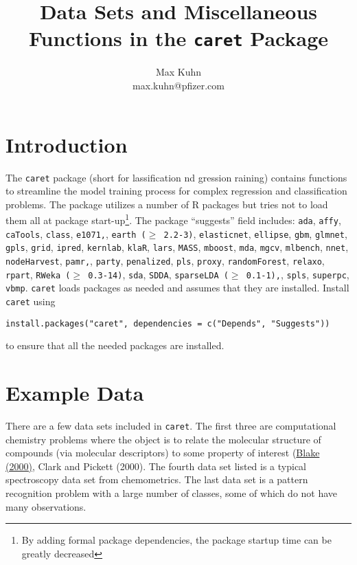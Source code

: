 \documentclass[12pt]{article}
\title{Data Sets and Miscellaneous Functions in the {\tt caret} Package}
\author{Max Kuhn \\ max.kuhn@pfizer.com}
\begin{document}
\maketitle

\thispagestyle{empty}
	
\section{Introduction}


The \texttt{caret} package (short for {\bf{\color{blue}{c}}}lassification {\bf{\color{blue}{a}}}nd {\bf{\color{blue}{re}}}gression {\bf{\color{blue}{t}}}raining) contains functions to streamline the model training process for complex regression and classification problems. The package utilizes a number of R packages but tries not to load them all at package start-up\footnote{By adding formal package dependencies, the package startup time can be greatly decreased}. The package ``suggests'' field includes: \texttt{ada}, \texttt{affy}, \texttt{caTools}, \texttt{class}, \texttt{e1071,}, \texttt{earth ($\ge$ 2.2-3)}, \texttt{elasticnet}, \texttt{ellipse}, \texttt{gbm}, \texttt{glmnet}, \texttt{gpls}, \texttt{grid}, \texttt{ipred}, \texttt{kernlab}, \texttt{klaR}, \texttt{lars}, \texttt{MASS}, \texttt{mboost}, \texttt{mda}, \texttt{mgcv}, \texttt{mlbench}, \texttt{nnet}, \texttt{nodeHarvest}, \texttt{pamr,}, \texttt{party}, \texttt{penalized}, \texttt{pls}, \texttt{proxy}, \texttt{randomForest}, \texttt{relaxo}, \texttt{rpart}, \texttt{RWeka ($\ge$ 0.3-14)}, \texttt{sda}, \texttt{SDDA}, \texttt{sparseLDA ($\ge$ 0.1-1),}, \texttt{spls}, \texttt{superpc}, \texttt{vbmp}. \texttt{caret} loads packages as needed and assumes that they are installed. Install \texttt{caret} using 
\begin{Verbatim}
install.packages("caret", dependencies = c("Depends", "Suggests"))
\end{Verbatim}
to ensure that all the needed packages are installed.


\section{Example Data}

There are a few data sets included in \texttt{caret}. The first three are computational chemistry problems where the object is to relate the molecular structure of compounds (via molecular descriptors) to some property of interest (\href{ http://dx.doi.org/10.1016/S1359-6446(99)01451-8}{Blake (2000)}, Clark and Pickett (2000). The fourth data set listed is a typical spectroscopy data set from chemometrics. The last data set is a pattern recognition problem with a large number of classes, some of which do not have many observations.
\end{document}

